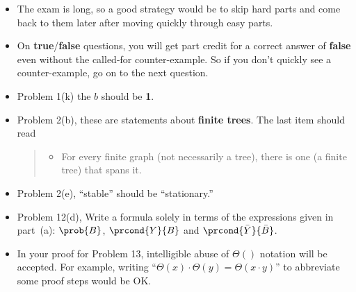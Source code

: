 \documentclass[handout]{mcs}
\begin{document}

\begin{center}

\end{center}

\begin{itemize}

\item The exam is long, so a good strategy would be to skip hard parts
  and come back to them later after moving quickly through easy parts.

\item On \textbf{true}/\textbf{false} questions, you will get part
  credit for a correct answer of \textbf{false} even without the
  called-for counter-example.  So if you don't quickly see a
  counter-example, go on to the next question.

\item Problem 1(k) the $b$ should be \textbf{1}.

\item Problem 2(b), these are statements about \textbf{finite trees}.
  The last item should read 
 \begin{quote}
 \begin{itemize}

 \item For every finite graph (not necessarily a tree), there is one (a
   finite tree) that spans it.

 \end{itemize}
 \end{quote}

\item Problem 2(e), ``stable'' should be ``stationary.''

\item Problem 12(d), Write a formula solely in terms of the
  expressions given in part~(a):
  $\prob{B}$, $\prcond{Y}{B}$ and $\prcond{\bar{Y}}{\bar{B}}$.

\item In your proof for Problem 13, intelligible abuse of $\Theta()$
  notation will be accepted.  For example, writing ``$\Theta(x) \cdot
  \Theta(y) = \Theta(x \cdot y)$'' to abbreviate some proof steps
  would be OK.

\end{itemize}
\end{document}
